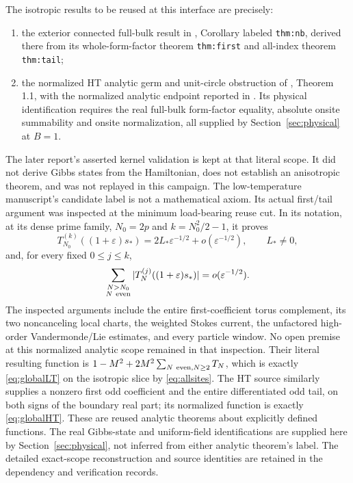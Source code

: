 \documentclass[11pt]{article}
\numberwithin{equation}{section}
\theoremstyle{definition}
\newcommand{\eps}{\varepsilon}
\begin{document}
The isotropic results to be reused at this interface are precisely:
\begin{enumerate}
\item the exterior connected full-bulk result in
\cite{LTsource}, Corollary labeled \texttt{thm:nb}, derived there from
its whole-form-factor theorem \texttt{thm:first} and all-index theorem
\texttt{thm:tail};
\item the normalized HT analytic germ and unit-circle obstruction of
\cite{HTsource}, Theorem 1.1, with the normalized analytic endpoint
reported in \cite{HTreport}. Its physical identification requires the
real full-bulk form-factor equality, absolute onsite summability and
onsite normalization, all supplied by Section~\ref{sec:physical} at
$B=1$.
\end{enumerate}
The later report's asserted kernel validation is kept at that literal
scope. It did not derive Gibbs states from the Hamiltonian, does not
establish an anisotropic theorem, and was not replayed in this campaign.
The low-temperature manuscript's candidate label is not a mathematical
axiom. Its actual first/tail argument was inspected at the minimum
load-bearing reuse cut. In its notation, at its dense prime family,
$N_0=2p$ and $k=N_0^2/2-1$, it proves
\[
 T_{N_0}^{(k)}((1+\eps)s_*)
 =2L_*\eps^{-1/2}+o(\eps^{-1/2}),\qquad L_*\ne0,
\]
and, for every fixed $0\le j\le k$,
\[
 \sum_{\substack{N>N_0\\N\ {\rm even}}}
 |T_N^{(j)}((1+\eps)s_*)|=o(\eps^{-1/2}).
\]
The inspected arguments include the entire first-coefficient torus
complement, its two noncanceling local charts, the weighted Stokes
current, the unfactored high-order Vandermonde/Lie estimates, and every
particle window. No open premise at this normalized analytic scope
remained in that inspection. Their literal resulting function is
$1-M^2+2M^2\sum_{N\ {\rm even},N\ge2}T_N$, which is exactly
\eqref{eq:globalLT} on the isotropic slice by \eqref{eq:allsites}.
The HT source similarly supplies a nonzero first odd coefficient and
the entire differentiated odd tail, on both signs of the boundary real
part; its normalized function is exactly \eqref{eq:globalHT}.
These are reused analytic theorems about explicitly defined functions.
The real Gibbs-state and uniform-field identifications are supplied
here by Section~\ref{sec:physical}, not inferred from either analytic
theorem's label. The detailed exact-scope reconstruction and source
identities are retained in the dependency and verification records.
\end{document}
